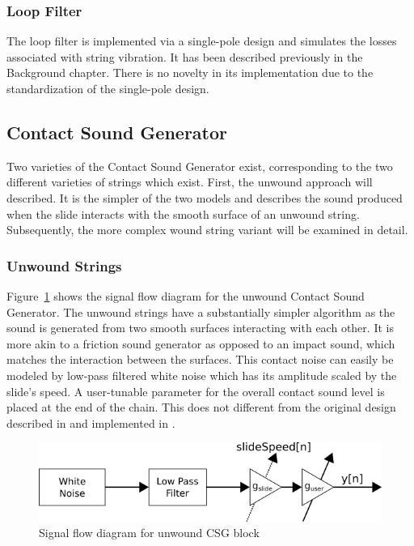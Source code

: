 \documentclass[../main.tex]{subfiles}
\begin{document}
\subsubsection{Loop Filter}
The loop filter is implemented via a single-pole design and simulates the losses associated with string vibration. It has been described previously in the Background chapter. There is no novelty in its implementation due to the standardization of the single-pole design.

\subsection{Contact Sound Generator}
Two varieties of the Contact Sound Generator exist, corresponding to the two different varieties of strings which exist. First, the unwound approach will described. It is the simpler of the two models and describes the sound produced when the slide interacts with the smooth surface of an unwound string. Subsequently, the more complex wound string variant will be examined in detail.

\subsubsection{Unwound Strings}
Figure~\ref{fig:CSG_unwound} shows the signal flow diagram for the unwound Contact Sound Generator. The unwound strings have a substantially simpler algorithm as the sound is generated from two smooth surfaces interacting with each other. It is more akin to a friction sound generator as opposed to an impact sound, which matches the interaction between the surfaces. This contact noise can easily be modeled by low-pass filtered white noise which has its amplitude scaled by the slide's speed. A user-tunable parameter for the overall contact sound level is placed at the end of the chain. This does not different from the original design described in  and implemented in .

\begin{figure}[h]
    \centering
    \includegraphics[scale=.5]{./images/diagrams/CSG_unwound.png}
    \caption{Signal flow diagram for unwound CSG block}
    \label{fig:CSG_unwound}
\end{figure}
\end{document}
